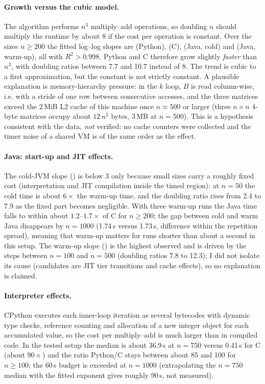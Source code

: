 \documentclass[11pt,a4paper]{article}
\begin{document}
\paragraph{Growth versus the cubic model.}
The algorithm performs $n^3$ multiply--add operations, so doubling $n$ should multiply the runtime by about 8 if the
cost per operation is constant. Over the sizes $n\ge200$ the fitted log--log slopes are
\ExpPython{} (Python), \ExpC{} (C), \ExpJavaCold{} (Java, cold) and \ExpJavaWarm{} (Java, warm-up), all with $R^2>0.998$.
Python and C therefore grow slightly \emph{faster} than $n^3$, with doubling ratios between 7.7 and 10.7 instead of 8.
The trend is cubic to a first approximation, but the constant is not strictly constant.
A plausible explanation is memory-hierarchy pressure: in the $k$ loop, $B$ is read column-wise, i.e. with a stride of one
row between consecutive accesses, and the three matrices exceed the 2\,MiB L2 cache of this machine once $n\approx 500$ or larger
(three $n\times n$ 4-byte matrices occupy about $12\,n^2$ bytes, 3\,MB at $n=500$). This is a hypothesis consistent with
the data, \emph{not} verified: no cache counters were collected and the timer noise of a shared VM is of the same order as
the effect.

\paragraph{Java: start-up and JIT effects.}
The cold-JVM slope (\ExpJavaCold) is below 3 only because small sizes carry a roughly fixed cost
(interpretation and JIT compilation inside the timed region): at $n=50$ the cold time is about $6\times$ the warm-up time,
and the doubling ratio rises from 2.4 to 7.9 as the fixed part becomes negligible. With three warm-up runs the Java time
falls to within about $1.2$--$1.7\times$ of C for $n\ge 200$; the gap between cold and warm Java disappears by
$n=1000$ (1.74\,s versus 1.73\,s, difference within the repetition spread), meaning that warm-up matters for runs shorter than about a second in this setup.
The warm-up slope (\ExpJavaWarm) is the highest observed and is driven by the steps between $n=100$ and $n=500$
(doubling ratios 7.8 to 12.3); I did not isolate its cause (candidates are JIT tier transitions and cache effects),
so no explanation is claimed.

\paragraph{Interpreter effects.}
CPython executes each inner-loop iteration as several bytecodes with dynamic type checks, reference counting and
allocation of a new integer object for each accumulated value, so the cost per multiply--add is much larger than in compiled code.
In the tested setup the median is about 36.9\,s at $n=750$ versus 0.41\,s for C
(about $90\times$) and the ratio Python/C stays between about 85 and 100 for $n\ge100$; the 60\,s budget is exceeded at $n=1000$
(extrapolating the $n=750$ median with the fitted exponent gives roughly 90\,s, not measured).
\end{document}
